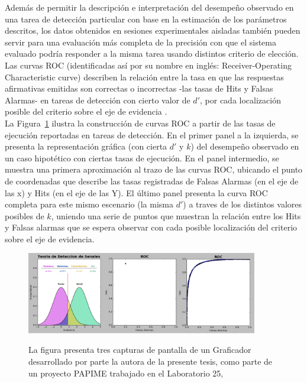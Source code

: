 Además de permitir la descripción e interpretación del desempeño observado en una tarea de detección particular con base en la estimación de los parámetros descritos, los datos obtenidos en sesiones experimentales aisladas también pueden servir para una evaluación más completa de la precisión con que el sistema evaluado podría responder a la misma tarea usando distintos criterio de elección. Las curvas ROC (identificadas así por su nombre en inglés: Receiver-Operating Characteristic curve) describen la relación entre la tasa en que las respuestas afirmativas emitidas son correctas o incorrectas -las tasas de Hits y Falsas Alarmas- en tareas de detección con cierto valor de $d'$, por cada localización posible del criterio sobre el eje de evidencia \parencite{McNicol2, Egan1959, Swets1973}.\\

La Figura~\ref{fig:Graf_ROC} ilustra la construcción de curvas ROC a partir de las tasas de ejecución reportadas en tareas de detección. En el primer panel a la izquierda, se presenta la representación gráfica (con cierta $d'$ y $k$) del desempeño observado en un caso hipotético con ciertas tasas de ejecución. En el panel intermedio, se muestra una primera aproximación al trazo de las curvas ROC, ubicando el punto de coordenadas que describe las tasas registradas de Falsas Alarmas (en el eje de las x) y Hits (en el eje de las Y). El último panel presenta la curva ROC completa para este mismo escenario (la misma $d'$) a traves de los distintos valores posibles de $k$, uniendo una serie de puntos que muestran la relación entre los Hits y Falsas alarmas que se espera observar con cada posible localización del criterio sobre el eje de evidencia.\\

\begin{figure}[th]
\centering
\includegraphics[width=0.90\textwidth]{Figures/Graficador_ROC12}\\
\caption[Ejemplo de Curva ROC]{La figura presenta tres capturas de pantalla de un Graficador desarrollado por parte la autora de la presente tesis, como parte de un proyecto PAPIME trabajado en el Laboratorio 25, \parencite{PAPIME}}
\label{fig:Graf_ROC}
\end{figure}

